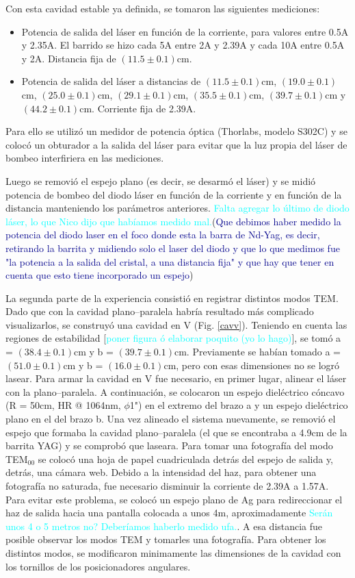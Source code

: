 \documentclass[10pt, a4paper]{article}%
\begin{document}
\begin{multicols}{2}
Con esta cavidad estable ya definida, se tomaron las siguientes mediciones:
\begin{itemize}
    \item Potencia de salida del láser en función de la corriente, para valores entre 0.5A y 2.35A. El barrido se hizo cada 5A entre 2A y 2.39A y cada 10A entre 0.5A y 2A. Distancia fija de $(11.5 \pm 0.1)$cm. 
    \item Potencia de salida del láser a distancias de $(11.5 \pm 0.1)$cm, $(19.0 \pm 0.1)$cm, $(25.0 \pm 0.1)$cm, $(29.1 \pm 0.1)$cm, $(35.5 \pm 0.1)$cm, $(39.7 \pm 0.1)$cm y $(44.2 \pm 0.1)$cm. Corriente fija de 2.39A. 
\end{itemize}
Para ello se utilizó un medidor de potencia óptica (Thorlabs, modelo S302C) y se colocó un obturador a la salida del láser para evitar que la luz propia del láser de bombeo interfiriera en las mediciones.

Luego se removió el espejo plano (es decir, se desarmó el láser) y se midió potencia de bombeo del diodo láser en función de la corriente y en función de la distancia manteniendo los parámetros anteriores. \textcolor{cyan}{Falta agregar lo último de diodo láser, lo que Nico dijo que habíamos medido mal.}({\textcolor{DarkBlue}{Que debimos haber medido la potencia del diodo laser en el foco donde esta la barra de Nd-Yag, es decir, retirando la barrita y midiendo solo el laser del diodo y que lo que medimos fue "la potencia a la salida del cristal, a una distancia fija" y que hay que tener en cuenta que esto tiene incorporado un espejo}})

La segunda parte de la experiencia consistió en registrar distintos modos TEM. Dado que con la cavidad plano--paralela habría resultado más complicado visualizarlos, se construyó una cavidad en V (Fig. \ref{cavv}). Teniendo en cuenta las regiones de estabilidad [\textcolor{cyan}{poner figura ó elaborar poquito (yo lo hago)}], se tomó a = $(38.4 \pm 0.1)$cm y b = $(39.7 \pm 0.1)$cm. Previamente se habían tomado a = $(51.0 \pm 0.1)$cm y b = $(16.0 \pm 0.1)$cm, pero con esas dimensiones no se logró lasear. Para armar la cavidad en V fue necesario, en primer lugar, alinear el láser con la plano--paralela. A continuación, se colocaron un espejo dieléctrico cóncavo  (R = 50cm, HR @ 1064nm, $\phi$1") en el extremo del brazo a y un espejo dieléctrico plano en el del brazo b. Una vez alineado el sistema nuevamente, se removió el espejo que formaba la cavidad plano--paralela (el que se encontraba a 4.9cm de la barrita YAG) y se comprobó que laseara.
Para tomar una fotografía del modo TEM$_{00}$ se colocó una hoja de papel cuadriculada detrás del espejo de salida y, detrás, una cámara web. Debido a la intensidad del haz, para obtener una fotografía no saturada, fue necesario disminuir la corriente de 2.39A a 1.57A. Para evitar este problema, se colocó un espejo plano de Ag para redireccionar el haz de salida hacia una pantalla colocada a unos 4m, aproximadamente \textcolor{cyan}{Serán unos 4 o 5 metros no? Deberíamos haberlo medido ufa.}. A esa distancia fue posible observar los modos TEM y tomarles una fotografía. Para obtener los distintos modos, se modificaron minimamente las dimensiones de la cavidad con los tornillos de los posicionadores angulares. 


\end{multicols}
\end{document}
